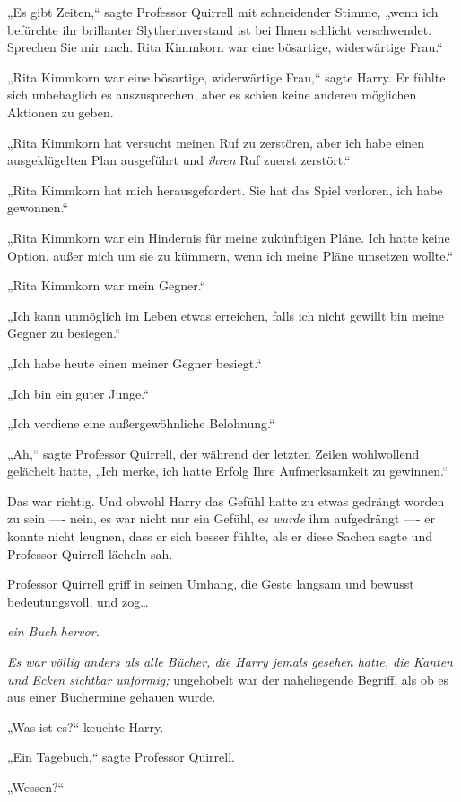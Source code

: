 {„Es gibt Zeiten,“ sagte Professor Quirrell mit schneidender Stimme, „wenn ich befürchte ihr brillanter Slytherinverstand ist bei Ihnen schlicht verschwendet. Sprechen Sie mir nach. Rita Kimmkorn war eine bösartige, widerwärtige Frau.“

„Rita Kimmkorn war eine bösartige, widerwärtige Frau,“ sagte Harry. Er fühlte sich unbehaglich es auszusprechen, aber es schien keine anderen möglichen Aktionen zu geben.

„Rita Kimmkorn hat versucht meinen Ruf zu zerstören, aber ich habe einen ausgeklügelten Plan ausgeführt und \emph{ihren} Ruf zuerst zerstört.“

„Rita Kimmkorn hat mich herausgefordert. Sie hat das Spiel verloren, ich habe gewonnen.“

„Rita Kimmkorn war ein Hindernis für meine zukünftigen Pläne. Ich hatte keine Option, außer mich um sie zu kümmern, wenn ich meine Pläne umsetzen wollte.“

„Rita Kimmkorn war mein Gegner.“

„Ich kann unmöglich im Leben etwas erreichen, falls ich nicht gewillt bin meine Gegner zu besiegen.“

„Ich habe heute einen meiner Gegner besiegt.“

„Ich bin ein guter Junge.“

„Ich verdiene eine außergewöhnliche Belohnung.“

„Ah,“ sagte Professor Quirrell, der während der letzten Zeilen wohlwollend gelächelt hatte, „Ich merke, ich hatte Erfolg Ihre Aufmerksamkeit zu gewinnen.“

Das war richtig. Und obwohl Harry das Gefühl hatte zu etwas gedrängt worden zu sein ---- nein, es war nicht nur ein Gefühl, es \emph{wurde} ihm aufgedrängt ---- er konnte nicht leugnen, dass er sich besser fühlte, als er diese Sachen sagte und Professor Quirrell lächeln sah.

Professor Quirrell griff in seinen Umhang, die Geste langsam und bewusst bedeutungsvoll, und zog…

\emph{ein Buch hervor.}

\emph{Es war völlig anders als alle Bücher, die Harry jemals gesehen hatte, die Kanten und Ecken sichtbar unförmig;} ungehobelt war der naheliegende Begriff, als ob es aus einer Büchermine gehauen wurde.

„Was ist es?“ keuchte Harry.

„Ein Tagebuch,“ sagte Professor Quirrell.

„Wessen?“

}
